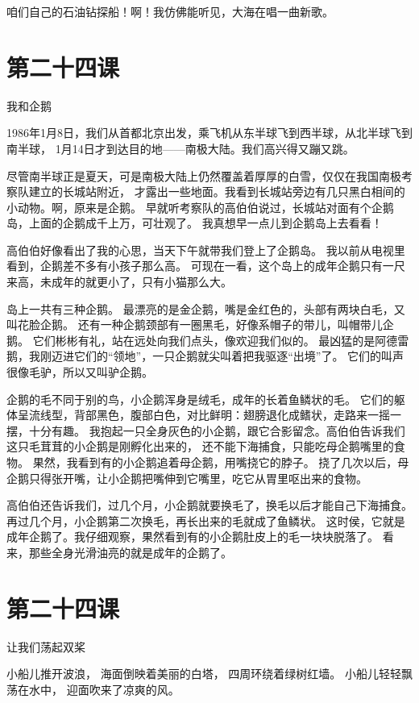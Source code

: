 \documentclass[12pt,UTF8]{ctexbook}
\begin{document}
咱们自己的石油钻探船！啊！我仿佛能听见，大海在唱一曲新歌。

\section{第二十四课}

我和企鹅

1986年1月8日，我们从首都北京出发，乘飞机从东半球飞到西半球，从北半球飞到南半球，
1月14日才到达目的地——南极大陆。我们高兴得又蹦又跳。

尽管南半球正是夏天，可是南极大陆上仍然覆盖着厚厚的白雪，仅仅在我国南极考察队建立的长城站附近，
才露出一些地面。我看到长城站旁边有几只黑白相间的小动物。啊，原来是企鹅。
早就听考察队的高伯伯说过，长城站对面有个企鹅岛，上面的企鹅成千上万，可壮观了。
我真想早一点儿到企鹅岛上去看看！

高伯伯好像看出了我的心思，当天下午就带我们登上了企鹅岛。
我以前从电视里看到，企鹅差不多有小孩子那么高。
可现在一看，这个岛上的成年企鹅只有一尺来高，未成年的就更小了，只有小猫那么大。

岛上一共有三种企鹅。
最漂亮的是金企鹅，嘴是金红色的，头部有两块白毛，又叫花脸企鹅。
还有一种企鹅颈部有一圈黑毛，好像系帽子的带儿，叫帽带儿企鹅。
它们彬彬有礼，站在远处向我们点头，像欢迎我们似的。
最凶猛的是阿德雷鹅，我刚迈进它们的“领地”，一只企鹅就尖叫着把我驱逐“出境”了。
它们的叫声很像毛驴，所以又叫驴企鹅。

企鹅的毛不同于别的鸟，小企鹅浑身是绒毛，成年的长着鱼鳞状的毛。
它们的躯体呈流线型，背部黑色，腹部白色，对比鲜明：翅膀退化成鳍状，走路来一摇一摆，十分有趣。
我抱起一只全身灰色的小企鹅，跟它合影留念。高伯伯告诉我们这只毛茸茸的小企鹅是刚孵化出来的，
还不能下海捕食，只能吃母企鹅嘴里的食物。
果然，我看到有的小企鹅追着母企鹅，用嘴挠它的脖子。
挠了几次以后，母企鹅只得张开嘴，让小企鹅把嘴伸到它嘴里，吃它从胃里呕出来的食物。

高伯伯还告诉我们，过几个月，小企鹅就要换毛了，换毛以后才能自己下海捕食。
再过几个月，小企鹅第二次换毛，再长出来的毛就成了鱼鳞状。
这时侯，它就是成年企鹅了。我仔细观察，果然看到有的小企鹅肚皮上的毛一块块脱落了。
看来，那些全身光滑油亮的就是成年的企鹅了。

\section{第二十四课}

让我们荡起双桨

小船儿推开波浪，
海面倒映着美丽的白塔，
四周环绕着绿树红墙。
小船儿轻轻飘荡在水中，
迎面吹来了凉爽的风。
\end{document}
